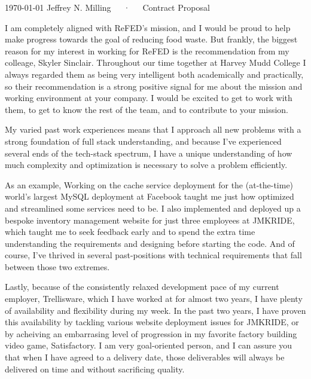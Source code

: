 \documentclass[11pt, a4paper]{awesome-cv-coverletter}
\begin{document}
\makecvheader[R]

\makecvfooter
  {\today}
  {Jeffrey N. Milling~~~·~~~Contract Proposal}
  {}

\makelettertitle

\begin{cvletter}

I am completely aligned with ReFED's mission, and I would be proud to help make
progress towards the goal of reducing food waste. But frankly, the biggest
reason for my interest in working for ReFED is the recommendation from my
colleage, Skyler Sinclair. Throughout our time together at Harvey Mudd College I
always regarded them as being very intelligent both academically and
practically, so their recommendation is a strong positive signal for me about
the mission and working environment at your company. I would be excited to get
to work with them, to get to know the rest of the team, and to contribute to
your mission.

My varied past work experiences means that I approach all new problems with a
strong foundation of full stack understanding, and because I've experienced
several ends of the tech-stack spectrum, I have a unique understanding of
how much complexity and optimization is necessary to solve a problem efficiently. 

As an example, Working on the cache service deployment for the (at-the-time)
world's largest MySQL deployment at Facebook taught me just how optimized and
streamlined some services need to be. I also implemented and deployed up a
bespoke inventory management website for just three employees at
JMKRIDE, which taught me to seek feedback early and to spend the extra time
understanding the requirements and designing before starting the code. And of
course, I've thrived in several past-positions with technical requirements that
fall between those two extremes.

Lastly, because of the consistently relaxed development pace of my current
employer, Trellisware, which I have worked at for almost two years, I have
plenty of availability and flexibility during my week. In the past two years, I
have proven this availability by tackling various website deployment issues for
JMKRIDE, or by acheiving an embarrasing level of progression in my favorite
factory building video game, Satisfactory. I am very goal-oriented
person, and I can assure you that when I have agreed to a delivery date, those
deliverables will always be delivered on time and without sacrificing quality.


\end{cvletter}
\end{document}
